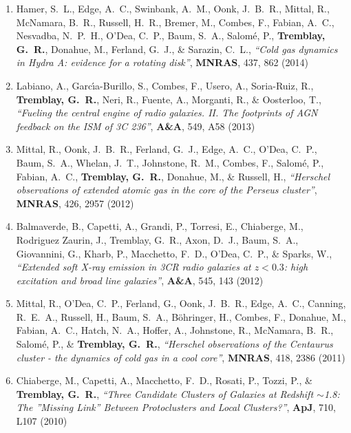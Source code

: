\documentclass[11pt]{article}
\begin{document}
\begin{enumerate}[resume]
\item Hamer, S.~L., Edge, A.~C., Swinbank, A.~M., Oonk, J.~B.~R., Mittal, R., McNamara, B.~R., Russell, H.~R., Bremer, M., Combes, F., Fabian, A.~C., Nesvadba, N.~P.~H., O'Dea, C.~P., Baum, S.~A., Salom\'{e}, P., \textbf{Tremblay, G.~R.}, Donahue, M., Ferland, G.~J., \& Sarazin, C.~L.,  \textit{``Cold gas dynamics in Hydra A: evidence for a rotating disk''}, \textbf{MNRAS}, 437, 862 (2014)




\item Labiano, A., Garc{\'{\i}}a-Burillo, S., Combes, F., Usero, A.,
Soria-Ruiz, R., \textbf{Tremblay, G.~R.}, Neri, R., Fuente, A., Morganti, R.,
\& Oosterloo, T.,  \textit{``Fueling the central engine of radio galaxies. II. The footprints of AGN feedback on the ISM of 3C 236''}, \textbf{A\&A}, 549,  A58 (2013)


\item Mittal, R., Oonk, J.~B.~R., Ferland, G.~J., Edge, A.~C., O'Dea, C.~P.,
Baum, S.~A., Whelan, J.~T., Johnstone, R.~M., Combes, F., Salom{\'e}, P.,
Fabian, A.~C., \textbf{Tremblay, G.~R.}, Donahue, M.,
\& Russell, H., \textit{``Herschel observations of extended atomic gas in the core of the Perseus cluster''}, \textbf{MNRAS}, 426,  2957 (2012)




\item Balmaverde, B., Capetti, A., Grandi, P., Torresi, E., Chiaberge, M.,
Rodriguez Zaurin, J., Tremblay, G.~R., Axon, D.~J., Baum, S.~A.,
Giovannini, G., Kharb, P., Macchetto, F.~D., O'Dea, C.~P.,
\& Sparks, W., \textit{``Extended soft X-ray emission in 3CR radio galaxies at $z< 0.3$: high excitation and broad line galaxies''}, \textbf{A\&A}, 545,  143 (2012)




\item Mittal, R., O'Dea, C.~P., Ferland, G., Oonk, J.~B.~R., Edge, A.~C.,
Canning, R.~E.~A., Russell, H., Baum, S.~A., B{\"o}hringer, H., Combes, F.,
Donahue, M., Fabian, A.~C., Hatch, N.~A., Hoffer, A., Johnstone, R.,
McNamara, B.~R., Salom{\'e}, P.,
\& \textbf{Tremblay, G.~R.}, \textit{``Herschel observations of the Centaurus cluster - the dynamics of cold gas in a cool core''}, \textbf{MNRAS}, 418,  2386 (2011)




\item Chiaberge, M., Capetti, A., Macchetto, F.~D., Rosati, P., Tozzi, P.,
\& \textbf{Tremblay, G.~R.}, \textit{``Three Candidate Clusters of Galaxies at Redshift $\sim$1.8: The ''Missing Link'' Between Protoclusters and Local Clusters?''}, \textbf{ApJ}, 710,  L107 (2010)






\end{enumerate}
\end{document}
